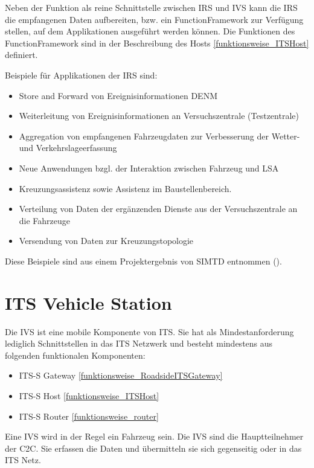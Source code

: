 Neben der Funktion als reine Schnittstelle zwischen \ac{IRS} und \ac{IVS} kann die \ac{IRS} die empfangenen Daten aufbereiten, bzw. ein FunctionFramework zur Verfügung stellen, auf dem Applikationen ausgeführt werden können. Die Funktionen des FunctionFramework sind in der Beschreibung des Hosts \ref{funktionsweise_ITSHost} definiert.  

Beispiele für Applikationen der \ac{IRS} sind:
\begin{itemize}
	\item Store and Forward von Ereignisinformationen \ac{DENM}
	\item Weiterleitung von Ereignisinformationen an Versuchszentrale (Testzentrale)
	\item Aggregation von empfangenen Fahrzeugdaten zur Verbesserung der Wetter- und Verkehrslageerfassung
	\item Neue Anwendungen bzgl. der Interaktion zwischen Fahrzeug und LSA
	\item  Kreuzungsassistenz sowie Assistenz im Baustellenbereich.
	\item Verteilung von Daten der ergänzenden Dienste aus der Versuchszentrale an die Fahrzeuge
	\item Versendung von Daten zur Kreuzungstopologie
\end{itemize}

Diese Beispiele sind aus einem Projektergebnis von \ac{SIMTD} entnommen (\cite{simtd-D12.1}). 



\section{ITS Vehicle Station}
Die \ac{IVS} ist eine mobile Komponente von \ac{ITS}. Sie hat als Mindestanforderung lediglich Schnittstellen in das \ac{ITS} Netzwerk und besteht mindestens aus folgenden funktionalen Komponenten:
\begin{itemize}
	\item  \ac{ITS-S} Gateway \ref{funktionsweise_RoadsideITSGateway}
	\item \ac{ITS-S} Host \ref{funktionsweise_ITSHost}
	\item \ac{ITS-S} Router \ref{funktionsweise_router} 
\end{itemize}

Eine \ac{IVS} wird in der Regel ein Fahrzeug sein. Die \ac{IVS} sind die Hauptteilnehmer der \ac{C2C}. Sie erfassen die Daten und übermitteln sie sich gegenseitig oder in das \ac{ITS} Netz. 